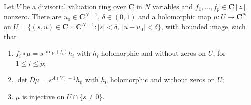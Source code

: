 \begin{lemma}\label{lem:c0-analytic-chart}
\leanok
{}
Let $V$ be a divisorial valuation ring over $\mathbf C$ in $N$ variables and $f_1,\dots,f_p\in\mathbf C[z]$ nonzero. There are
$u_0\in\mathbf C^{N-1}$, $\delta\in(0,1)$ and a holomorphic map $\mu\colon U\to\mathbf C^N$ on
$U=\{(s,u)\in\mathbf C\times\mathbf C^{N-1}:|s|<\delta,\ |u-u_0|<\delta\}$, with bounded image, such that
\begin{enumerate}
\item $f_i\circ\mu=s^{\operatorname{ord}_V(f_i)}h_i$ with $h_i$ holomorphic and without zeros on $U$, for $1\le i\le p$;
\item $\det D\mu=s^{A(V)-1}h_0$ with $h_0$ holomorphic and without zeros on $U$;
\item $\mu$ is injective on $U\cap\{s\ne0\}$.
\end{enumerate}
\end{lemma}

